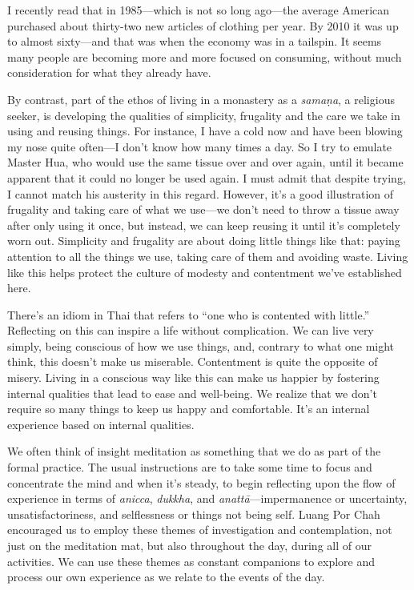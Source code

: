 
I recently read that in 1985---which is not so long ago---the average 
American purchased about thirty-two new articles of clothing per year. 
By 2010 it was up to almost sixty---and that was when the economy was 
in a tailspin. It seems many people are becoming more and more focused 
on consuming, without much consideration for what they already have.

By contrast, part of the ethos of living in a monastery as a 
\emph{samaṇa}, a religious seeker, is developing the qualities of 
simplicity, frugality and the care we take in using and reusing things. 
For instance, I have a cold now and have been blowing my nose quite 
often---I don't know how many times a day. So I try to emulate Master 
Hua, who would use the same tissue over and over again, until it became 
apparent that it could no longer be used again. I must admit that 
despite trying, I cannot match his austerity in this regard. However, 
it's a good illustration of frugality and taking care of what we 
use---we don't need to throw a tissue away after only using it once, 
but instead, we can keep reusing it until it's completely worn out. 
Simplicity and frugality are about doing little things like that: 
paying attention to all the things we use, taking care of them and 
avoiding waste. Living like this helps protect the culture of modesty 
and contentment we've established here.

There's an idiom in Thai that refers to ``one who is contented with 
little.'' Reflecting on this can inspire a life without complication. 
We can live very simply, being conscious of how we use things, and, 
contrary to what one might think, this doesn't make us miserable. 
Contentment is quite the opposite of misery. Living in a conscious way 
like this can make us happier by fostering internal qualities that lead 
to ease and well-being. We realize that we don't require so many things 
to keep us happy and comfortable. It's an internal experience based on 
internal qualities.


We often think of insight meditation as something that we do as part of 
the formal practice. The usual instructions are to take some time to 
focus and concentrate the mind and when it's steady, to begin 
reflecting upon the flow of experience in terms of \emph{anicca}, 
\emph{dukkha}, and \emph{anattā}---impermanence or uncertainty, 
unsatisfactoriness, and selflessness or things not being self. Luang 
Por Chah encouraged us to employ these themes of investigation and 
contemplation, not just on the meditation mat, but also throughout the 
day, during all of our activities. We can use these themes as constant 
companions to explore and process our own experience as we relate to 
the events of the day.

